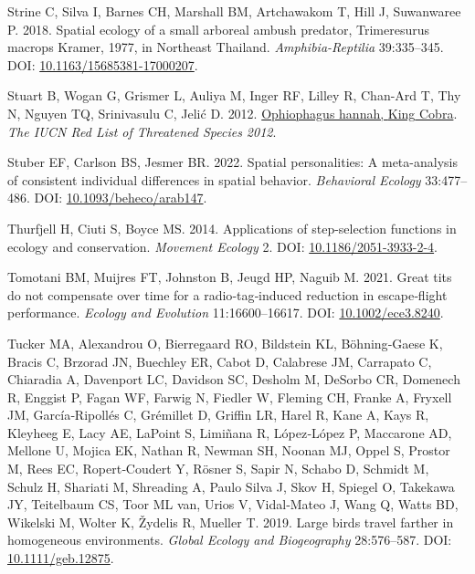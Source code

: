 \documentclass[10pt,a4paper]{article}
\newlength{\cslhangindent}
\newenvironment{CSLReferences}[2] %
 {\begin{list}{}{%
  \setlength{\itemindent}{0pt}
  \setlength{\leftmargin}{0pt}
  \setlength{\parsep}{0pt}
  \ifodd #1
   \setlength{\leftmargin}{\cslhangindent}
   \setlength{\itemindent}{-1\cslhangindent}
  \fi
  \setlength{\itemsep}{#2\baselineskip}}}
 {\end{list}}
\begin{document}
\begin{CSLReferences}{1}{0}
Strine C, Silva I, Barnes CH, Marshall BM, Artchawakom T, Hill J, Suwanwaree P. 2018. Spatial ecology of a small arboreal ambush predator, {Trimeresurus} macrops {Kramer}, 1977, in {Northeast} {Thailand}. \emph{Amphibia-Reptilia} 39:335--345. DOI: \href{https://doi.org/10.1163/15685381-17000207}{10.1163/15685381-17000207}.

Stuart B, Wogan G, Grismer L, Auliya M, Inger RF, Lilley R, Chan-Ard T, Thy N, Nguyen TQ, Srinivasulu C, Jelić D. 2012. \href{http://dx.doi.org/10.2305/IUCN.UK.2012-\%201.RLTS.T177540A1491874.en\%0ACopyright:}{Ophiophagus hannah, {King} {Cobra}}. \emph{The IUCN Red List of Threatened Species 2012}.

Stuber EF, Carlson BS, Jesmer BR. 2022. Spatial personalities: A meta-analysis of consistent individual differences in spatial behavior. \emph{Behavioral Ecology} 33:477--486. DOI: \href{https://doi.org/10.1093/beheco/arab147}{10.1093/beheco/arab147}.

Thurfjell H, Ciuti S, Boyce MS. 2014. Applications of step-selection functions in ecology and conservation. \emph{Movement Ecology} 2. DOI: \href{https://doi.org/10.1186/2051-3933-2-4}{10.1186/2051-3933-2-4}.

Tomotani BM, Muijres FT, Johnston B, Jeugd HP, Naguib M. 2021. Great tits do not compensate over time for a radio‐tag‐induced reduction in escape‐flight performance. \emph{Ecology and Evolution} 11:16600--16617. DOI: \href{https://doi.org/10.1002/ece3.8240}{10.1002/ece3.8240}.

Tucker MA, Alexandrou O, Bierregaard RO, Bildstein KL, Böhning‐Gaese K, Bracis C, Brzorad JN, Buechley ER, Cabot D, Calabrese JM, Carrapato C, Chiaradia A, Davenport LC, Davidson SC, Desholm M, DeSorbo CR, Domenech R, Enggist P, Fagan WF, Farwig N, Fiedler W, Fleming CH, Franke A, Fryxell JM, García‐Ripollés C, Grémillet D, Griffin LR, Harel R, Kane A, Kays R, Kleyheeg E, Lacy AE, LaPoint S, Limiñana R, López‐López P, Maccarone AD, Mellone U, Mojica EK, Nathan R, Newman SH, Noonan MJ, Oppel S, Prostor M, Rees EC, Ropert‐Coudert Y, Rösner S, Sapir N, Schabo D, Schmidt M, Schulz H, Shariati M, Shreading A, Paulo Silva J, Skov H, Spiegel O, Takekawa JY, Teitelbaum CS, Toor ML van, Urios V, Vidal‐Mateo J, Wang Q, Watts BD, Wikelski M, Wolter K, Žydelis R, Mueller T. 2019. Large birds travel farther in homogeneous environments. \emph{Global Ecology and Biogeography} 28:576--587. DOI: \href{https://doi.org/10.1111/geb.12875}{10.1111/geb.12875}.


\end{CSLReferences}
\end{document}
